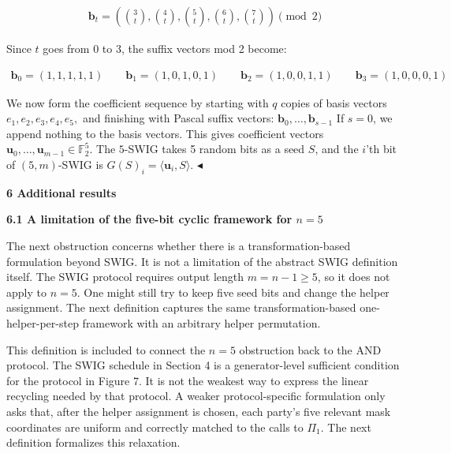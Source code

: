 \[\begin{gathered}
\mathbf{b}_{t}=\left(\binom{3}{t},\binom{4}{t},\binom{5}{t},\binom{6}{t},\binom{7}{t}\right)\pmod{2}
\end{gathered}\]


Since $t$ goes from $0$ to $3$, the suffix vectors mod 2 become:\par


\[\begin{gathered}
\mathbf{b}_{0}=(1,1,1,1,1)\qquad\mathbf{b}_{1}=(1,0,1,0,1)\qquad\mathbf{b}_{2}=(1,0,0,1,1)\qquad\mathbf{b}_{3}=(1,0,0,0,1)
\end{gathered}\]


We now form the coefficient sequence by starting with $q$ copies of basis vectors
$e_{1},e_{2},e_{3},e_{4},e_{5},$
and finishing with Pascal suffix vectors:
$\mathbf{b}_{0},\ldots,\mathbf{b}_{s-1}$
If $s=0$, we append nothing to the basis vectors. This gives coefficient vectors
$\mathbf{u}_{0},\ldots,\mathbf{u}_{m-1}\in\mathbb{F}_{2}^{5}$. The $5$-SWIG takes 5 random bits as a seed $S$, and the $i$’th bit of $(5,m)$-SWIG is
$G(S)_{i}=\langle\mathbf{u}_{i},S\rangle$.
$\blacktriangleleft$\par







\par\medskip\noindent\textbf{
6 Additional results}\par




\par\medskip\noindent\textbf{
6.1 A limitation of the five-bit cyclic framework for $n=5$
}\par




The next obstruction concerns whether there is a transformation-based formulation beyond SWIG. It is not a limitation of the abstract SWIG definition itself. The SWIG protocol requires output length $m=n-1\geq 5$, so it does not apply to $n=5$. One might still try to keep five seed bits and change the helper assignment. The next definition captures the same transformation-based one-helper-per-step framework with an arbitrary helper permutation.\par




This definition is included to connect the $n=5$ obstruction back to the AND protocol. The SWIG schedule in Section 4 is a generator-level sufficient condition for the protocol in Figure 7. It is not the weakest way to express the linear recycling needed by that protocol. A weaker protocol-specific formulation only asks that, after the helper assignment is chosen, each party’s five relevant mask coordinates are uniform and correctly matched to the calls to $\Pi_{1}$. The next definition formalizes this relaxation.\par




